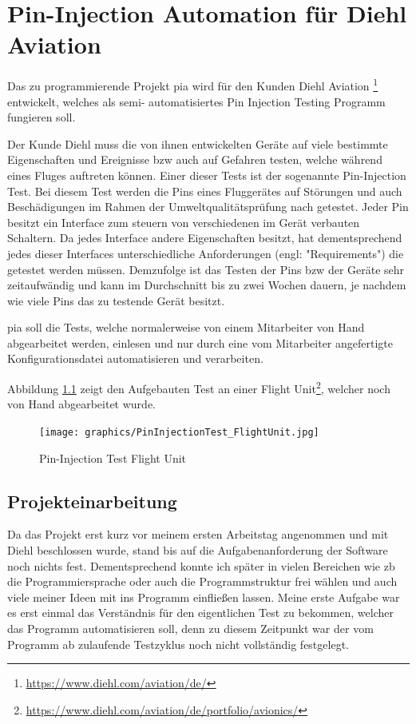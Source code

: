 \chapter{Pin-Injection Automation für Diehl Aviation}
\label{ch:pia}

Das zu programmierende Projekt \ac{pia} wird für den Kunden Diehl Aviation
\footnote{\url{https://www.diehl.com/aviation/de/}} entwickelt, welches als semi-
automatisiertes Pin Injection Testing Programm fungieren soll.

Der Kunde Diehl muss die von ihnen entwickelten Geräte auf viele bestimmte Eigenschaften und
Ereignisse \ac{bzw} auch auf Gefahren testen, welche während eines Fluges auftreten können.
Einer dieser Tests ist der sogenannte Pin-Injection Test.
Bei diesem Test werden die Pins eines Fluggerätes auf Störungen und auch Beschädigungen im
Rahmen der Umweltqualitätsprüfung nach \cite{DO-160} getestet. Jeder Pin besitzt ein Interface
zum steuern von verschiedenen im Gerät verbauten Schaltern. Da jedes Interface andere
Eigenschaften besitzt, hat dementsprechend jedes dieser Interfaces unterschiedliche
Anforderungen (engl: "Requirements") die getestet werden müssen.
Demzufolge ist das Testen der Pins \ac{bzw} der Geräte sehr zeitaufwändig und kann im
Durchschnitt bis zu zwei Wochen dauern, je nachdem wie viele Pins das zu testende Gerät
besitzt.

\ac{pia} soll die Tests, welche normalerweise von einem Mitarbeiter von Hand abgearbeitet
werden, einlesen und nur durch eine vom Mitarbeiter angefertigte Konfigurationsdatei
automatisieren und verarbeiten.

\pagebreak
Abbildung \ref{fig:flight_unit} zeigt den Aufgebauten Test an einer Flight Unit\footnote{\url{https://www.diehl.com/aviation/de/portfolio/avionics/}}, welcher noch von Hand abgearbeitet wurde.

\begin{figure}[H]
	\centering
	\texttt{[image: graphics/PinInjectionTest\_FlightUnit.jpg]}
	\caption{Pin-Injection Test Flight Unit}
	\label{fig:flight_unit}
\end{figure}


\section{Projekteinarbeitung}
\label{sec:prj-einarbeitung}

Da das Projekt erst kurz vor meinem ersten Arbeitstag angenommen und mit Diehl beschlossen
wurde, stand bis auf die Aufgabenanforderung der Software noch nichts fest. Dementsprechend
konnte ich später in vielen Bereichen wie \ac{zb} die Programmiersprache oder auch die
Programmstruktur frei wählen und auch viele meiner Ideen mit ins Programm einfließen lassen.
Meine erste Aufgabe war es erst einmal das Verständnis für den eigentlichen Test zu bekommen,
welcher das Programm automatisieren soll, denn zu diesem Zeitpunkt war der vom Programm
ab zulaufende Testzyklus noch nicht vollständig festgelegt. 


